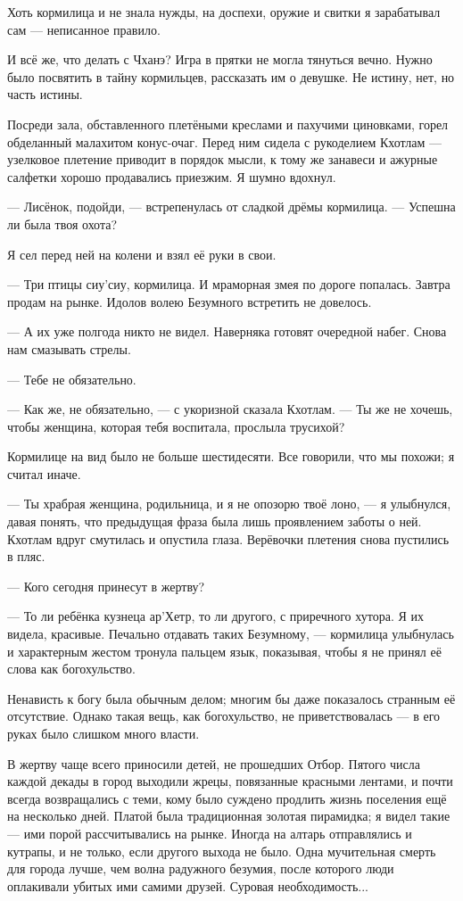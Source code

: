 Хоть кормилица и не знала нужды, на доспехи, оружие и свитки я зарабатывал сам --- неписанное правило.

И всё же, что делать с Чханэ?
Игра в прятки не могла тянуться вечно.
Нужно было посвятить в тайну кормильцев, рассказать им о девушке.
Не истину, нет, но часть истины.

Посреди зала, обставленного плетёными креслами и пахучими циновками, горел обделанный малахитом конус-очаг.
Перед ним сидела с рукоделием Кхотлам --- узелковое плетение приводит в порядок мысли, к тому же занавеси и ажурные салфетки хорошо продавались приезжим.
Я шумно вдохнул.

--- Лисёнок, подойди, --- встрепенулась от сладкой дрёмы кормилица.
--- Успешна ли была твоя охота?

Я сел перед ней на колени и взял её руки в свои.

--- Три птицы сиу'сиу, кормилица.
И мраморная змея по дороге попалась.
Завтра продам на рынке.
Идолов волею Безумного встретить не довелось.

--- А их уже полгода никто не видел.
Наверняка готовят очередной набег.
Снова нам смазывать стрелы.

--- Тебе не обязательно.

--- Как же, не обязательно, --- с укоризной сказала Кхотлам.
--- Ты же не хочешь, чтобы женщина, которая тебя воспитала, прослыла трусихой?

Кормилице на вид было не больше шестидесяти.
Все говорили, что мы похожи;
я считал иначе.

--- Ты храбрая женщина, родильница, и я не опозорю твоё лоно, --- я улыбнулся, давая понять, что предыдущая фраза была лишь проявлением заботы о ней.
Кхотлам вдруг смутилась и опустила глаза.
Верёвочки плетения снова пустились в пляс.

--- Кого сегодня принесут в жертву?

--- То ли ребёнка кузнеца ар’Хетр, то ли другого, с приречного хутора.
Я их видела, красивые.
Печально отдавать таких Безумному, --- кормилица улыбнулась и характерным жестом тронула пальцем язык, показывая, чтобы я не принял её слова как богохульство.

Ненависть к богу была обычным делом;
многим бы даже показалось странным её отсутствие.
Однако такая вещь, как богохульство, не приветствовалась --- в его руках было слишком много власти.

В жертву чаще всего приносили детей, не прошедших Отбор.
Пятого числа каждой декады в город выходили жрецы, повязанные красными лентами, и почти всегда возвращались с теми, кому было суждено продлить жизнь поселения ещё на несколько дней.
Платой была традиционная золотая пирамидка;
я видел такие --- ими порой рассчитывались на рынке.
Иногда на алтарь отправлялись и кутрапы, и не только, если другого выхода не было.
Одна мучительная смерть для города лучше, чем волна радужного безумия, после которого люди оплакивали убитых ими самими друзей.
Суровая необходимость...

